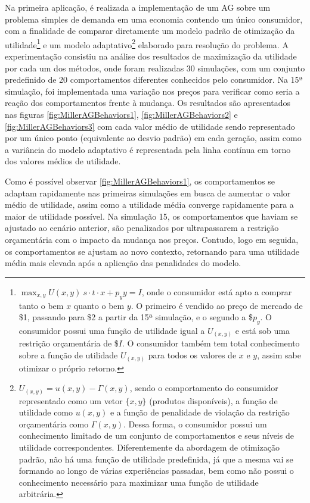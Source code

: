 Na primeira aplicação, é realizada a implementação de um AG sobre um problema simples de demanda em uma economia contendo um único consumidor, com a finalidade de comparar diretamente um modelo padrão de otimização da utilidade\footnote{$\max_{x,y} U(x,y) ~ s \cdot t \cdot x + p_{y}y = I$, onde o consumidor está apto a comprar tanto o bem $x$ quanto o bem $y$. O primeiro é vendido ao preço de mercado de \$1, passando para \$2 a partir da 15ª simulação, e o segundo a \$$p_y$. O consumidor possui uma função de utilidade igual a $U_{(x,y)}$ e está sob uma restrição orçamentária de \$$I$. O consumidor também tem total conhecimento sobre a função de utilidade $U_{(x,y)}$ para todos os valores de $x$ e $y$, assim sabe otimizar o próprio retorno.} e um modelo adaptativo\footnote{$U_{(x,y)} = u(x,y) - \Gamma (x, y)$, sendo o comportamento do consumidor representado como um vetor $\{x,y\}$ (produtos disponíveis), a função de utilidade como $u(x,y)$ e a função de penalidade de violação da restrição orçamentária como $\Gamma (x, y)$. Dessa forma, o consumidor possui um conhecimento limitado de um conjunto de comportamentos e seus níveis de utilidade correspondentes. Diferentemente da abordagem de otimização padrão, não há uma função de utilidade predefinida, já que a mesma vai se formando ao longo de várias experiências passadas, bem como não possui o conhecimento necessário para maximizar uma função de utilidade arbitrária.} elaborado para resolução do problema. A experimentação consistiu na análise dos resultados de maximização da utilidade por cada um dos métodos, onde foram realizadas 30 simulações, com um conjunto predefinido de 20 comportamentos diferentes conhecidos pelo consumidor. Na 15ª simulação, foi implementada uma variação nos preços para verificar como seria a reação dos comportamentos frente à mudança. Os resultados são apresentados nas figuras \autoref{fig:MillerAGBehaviors1}, \autoref{fig:MillerAGBehaviors2} e \autoref{fig:MillerAGBehaviors3} com cada valor médio de utilidade sendo representado por um único ponto (equivalente ao desvio padrão) em cada geração, assim como a variância do modelo adaptativo é representada pela linha contínua em torno dos valores médios de utilidade.

Como é possível observar \autoref{fig:MillerAGBehaviors1}, os comportamentos se adaptam rapidamente nas primeiras simulações em busca de aumentar o valor médio de utilidade, assim como a utilidade média converge rapidamente para a maior de utilidade possível. Na simulação 15, os comportamentos que haviam se ajustado ao cenário anterior, são penalizados por ultrapassarem a restrição orçamentária com o impacto da mudança nos preços. Contudo, logo em seguida, os comportamentos se ajustam ao novo contexto, retornando para uma utilidade média mais elevada após a aplicação das penalidades do modelo.

